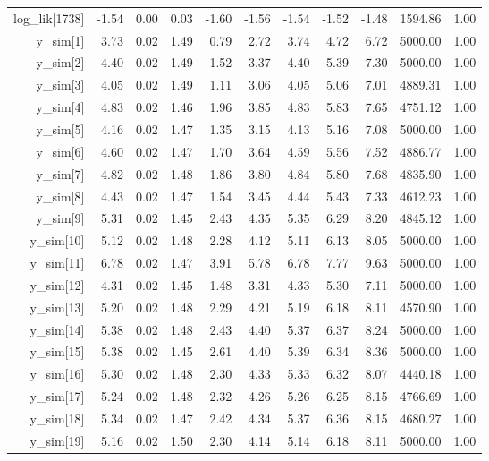 \begin{table}[ht]
\begin{tabular}{rrrrrrrrrrr}
  log\_lik[1738] & -1.54 & 0.00 & 0.03 & -1.60 & -1.56 & -1.54 & -1.52 & -1.48 & 1594.86 & 1.00 \\ 
  y\_sim[1] & 3.73 & 0.02 & 1.49 & 0.79 & 2.72 & 3.74 & 4.72 & 6.72 & 5000.00 & 1.00 \\ 
  y\_sim[2] & 4.40 & 0.02 & 1.49 & 1.52 & 3.37 & 4.40 & 5.39 & 7.30 & 5000.00 & 1.00 \\ 
  y\_sim[3] & 4.05 & 0.02 & 1.49 & 1.11 & 3.06 & 4.05 & 5.06 & 7.01 & 4889.31 & 1.00 \\ 
  y\_sim[4] & 4.83 & 0.02 & 1.46 & 1.96 & 3.85 & 4.83 & 5.83 & 7.65 & 4751.12 & 1.00 \\ 
  y\_sim[5] & 4.16 & 0.02 & 1.47 & 1.35 & 3.15 & 4.13 & 5.16 & 7.08 & 5000.00 & 1.00 \\ 
  y\_sim[6] & 4.60 & 0.02 & 1.47 & 1.70 & 3.64 & 4.59 & 5.56 & 7.52 & 4886.77 & 1.00 \\ 
  y\_sim[7] & 4.82 & 0.02 & 1.48 & 1.86 & 3.80 & 4.84 & 5.80 & 7.68 & 4835.90 & 1.00 \\ 
  y\_sim[8] & 4.43 & 0.02 & 1.47 & 1.54 & 3.45 & 4.44 & 5.43 & 7.33 & 4612.23 & 1.00 \\ 
  y\_sim[9] & 5.31 & 0.02 & 1.45 & 2.43 & 4.35 & 5.35 & 6.29 & 8.20 & 4845.12 & 1.00 \\ 
  y\_sim[10] & 5.12 & 0.02 & 1.48 & 2.28 & 4.12 & 5.11 & 6.13 & 8.05 & 5000.00 & 1.00 \\ 
  y\_sim[11] & 6.78 & 0.02 & 1.47 & 3.91 & 5.78 & 6.78 & 7.77 & 9.63 & 5000.00 & 1.00 \\ 
  y\_sim[12] & 4.31 & 0.02 & 1.45 & 1.48 & 3.31 & 4.33 & 5.30 & 7.11 & 5000.00 & 1.00 \\ 
  y\_sim[13] & 5.20 & 0.02 & 1.48 & 2.29 & 4.21 & 5.19 & 6.18 & 8.11 & 4570.90 & 1.00 \\ 
  y\_sim[14] & 5.38 & 0.02 & 1.48 & 2.43 & 4.40 & 5.37 & 6.37 & 8.24 & 5000.00 & 1.00 \\ 
  y\_sim[15] & 5.38 & 0.02 & 1.45 & 2.61 & 4.40 & 5.39 & 6.34 & 8.36 & 5000.00 & 1.00 \\ 
  y\_sim[16] & 5.30 & 0.02 & 1.48 & 2.30 & 4.33 & 5.33 & 6.32 & 8.07 & 4440.18 & 1.00 \\ 
  y\_sim[17] & 5.24 & 0.02 & 1.48 & 2.32 & 4.26 & 5.26 & 6.25 & 8.15 & 4766.69 & 1.00 \\ 
  y\_sim[18] & 5.34 & 0.02 & 1.47 & 2.42 & 4.34 & 5.37 & 6.36 & 8.15 & 4680.27 & 1.00 \\ 
  y\_sim[19] & 5.16 & 0.02 & 1.50 & 2.30 & 4.14 & 5.14 & 6.18 & 8.11 & 5000.00 & 1.00 \\ 

\end{tabular}
\end{table}
